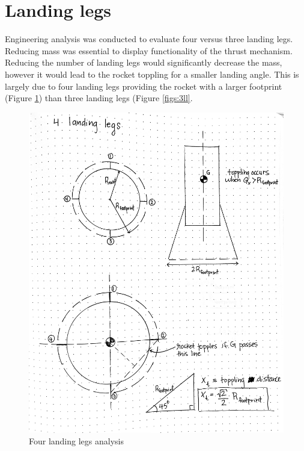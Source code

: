 \section{Landing legs} 
\label{ea:landing-legs}
Engineering analysis was conducted to evaluate four versus three landing legs. Reducing mass was essential to display functionality of the thrust mechanism. Reducing the number of landing legs would significantly decrease the mass, however it would lead to the rocket toppling for a smaller landing angle. This is largely due to four landing legs providing the rocket with a larger footprint (Figure \ref{figs:4ll}) than three landing legs (Figure \ref{figs:3ll}.


\begin{figure}[H]
\centering
\includegraphics[scale=0.1]{src/figs/4landinglegsdrawing.jpeg}
\caption{Four landing legs analysis}
\label{figs:4ll}
\end{figure}

